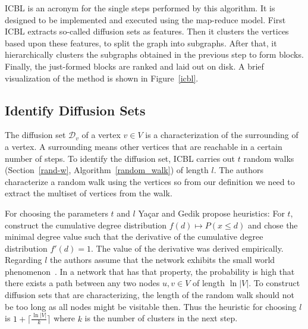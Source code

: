     ICBL is an acronym for the single steps performed by this algorithm. 
    It is designed to be implemented and executed using the map-reduce model.
    First ICBL extracts so-called diffusion sets as features.
    Then it clusters the vertices based upon these features, to split the graph into subgraphs.
    After that, it hierarchically clusters the subgraphs obtained in the previous step to form blocks.
    Finally, the just-formed blocks are ranked and laid out on disk.
    A brief visualization of the method is shown in Figure~\ref{icbl}.
    
    \subsection*{Identify Diffusion Sets}
    The diffusion set $\mathcal{D}_v$ of a vertex $v \in V$ is a characterization of the surrounding of a vertex. 
    A surrounding means other vertices that are reachable in a certain number of steps.
    To identify the diffusion set, ICBL carries out $t$ random walks (Section~\ref{rand-w}, Algorithm~\ref{random_walk}) of length $l$.
    The authors characterize a random walk using the vertices so from our definition we need to extract the multiset of vertices from the walk.
    
    For choosing the parameters $t$ and $l$ Ya\c{c}ar and Gedik propose heuristics: 
    For $t$, construct the cumulative degree distribution $f(d) \mapsto P(x \leq d)$ and chose the minimal degree value such that the derivative of the cumulative degree distribution $f'(d) = 1$. The value of the derivative was derived empirically.
    Regarding $l$ the authors assume that the network exhibits the small world phenomenon~\autocite{kleinberg2000small}.
    In a network that has that property, the probability is high that there exists a path between any two nodes $u,v \in V$ of length $\ln{|V|}$.
    To construct diffusion sets that are characterizing, the length of the random walk should not be too long as all nodes might be visitable then. Thus the heuristic for choosing $l$ is $1 + \lceil \frac{\ln |V|}{k} \rceil$ where $k$ is the number of clusters in the next step.
    
